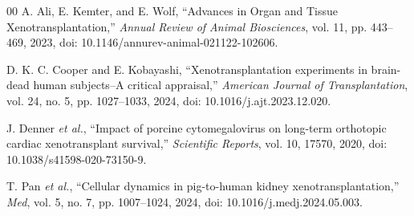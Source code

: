 \documentclass[conference]{IEEEtran}
\begin{document}
\begin{thebibliography}{00}
 A. Ali, E. Kemter, and E. Wolf, ``Advances in Organ and Tissue Xenotransplantation,'' \emph{Annual Review of Animal Biosciences}, vol. 11, pp. 443--469, 2023, doi: 10.1146/annurev-animal-021122-102606.

 D. K. C. Cooper and E. Kobayashi, ``Xenotransplantation experiments in brain-dead human subjects--A critical appraisal,'' \emph{American Journal of Transplantation}, vol. 24, no. 5, pp. 1027--1033, 2024, doi: 10.1016/j.ajt.2023.12.020.

 J. Denner \emph{et al.}, ``Impact of porcine cytomegalovirus on long-term orthotopic cardiac xenotransplant survival,'' \emph{Scientific Reports}, vol. 10, 17570, 2020, doi: 10.1038/s41598-020-73150-9.

 T. Pan \emph{et al.}, ``Cellular dynamics in pig-to-human kidney xenotransplantation,'' \emph{Med}, vol. 5, no. 7, pp. 1007--1024, 2024, doi: 10.1016/j.medj.2024.05.003.

\end{thebibliography}
\end{document}
